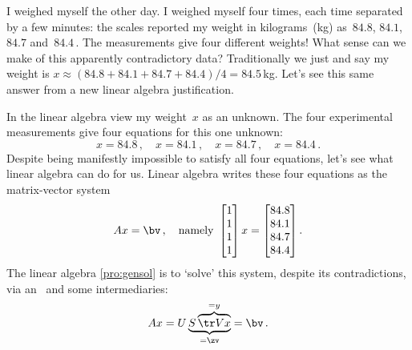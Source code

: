 \begin{example} \label{eg:fourwts}
I weighed myself the other day. 
I weighed myself four times, each time separated by a few minutes:  the scales reported my weight in kilograms~(kg) as~\(84.8\), \(84.1\), \(84.7\) and~\(84.4\)\,.
The measurements give four different weights!
What sense can we make of this apparently contradictory data?
Traditionally we just  and say my weight is \(x\approx (84.8+84.1+84.7+84.4)/4=84.5\)\,kg.
Let's see this same answer from a new linear algebra justification.

In the linear algebra view my weight~\(x\) as an unknown.
The four experimental measurements give four equations for this one unknown:
\begin{equation*}
x=84.8\,,\quad
x=84.1\,,\quad
x=84.7\,,\quad
x=84.4\,.
\end{equation*}
Despite being manifestly impossible to satisfy all four equations, let's see what linear algebra can do for us.
Linear algebra writes these four equations as the matrix-vector system
\begin{equation*}
Ax=\bv\,,\quad\text{namely }
\begin{bmatrix} 1\\1\\1\\1 \end{bmatrix}x
=\begin{bmatrix} 84.8\\84.1\\84.7\\84.4 \end{bmatrix}.
\end{equation*}
The linear algebra \autoref{pro:gensol} is to `solve' this system, despite its contradictions, via an \svd\ and some intermediaries:
\begin{equation*}
Ax=U\underbrace{S\overbrace{\tr Vx}^{=y}}_{=\zv}=\bv\,.
\end{equation*}


\end{example}
